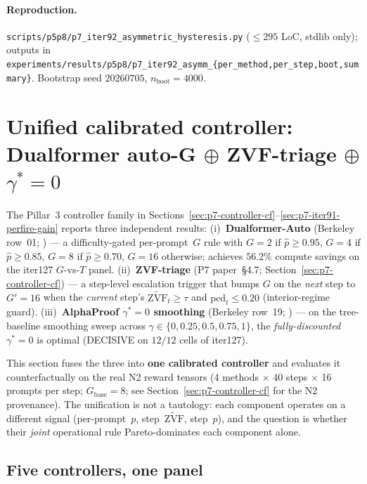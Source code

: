 \documentclass{article}
\newcommand{\zvf}{\ensuremath{\widetilde{\mathrm{ZVF}}}}
\begin{document}
\paragraph{Reproduction.}
\texttt{scripts/p5p8/p7\_iter92\_asymmetric\_hysteresis.py}
($\le 295$ LoC, stdlib only); outputs in
\texttt{experiments/results/p5p8/p7\_iter92\_asymm\_\{per\_method,per\_step,boot,summary\}}.
Bootstrap seed $20260705$, $n_{\mathrm{boot}}{=}4000$. \section{Unified calibrated controller: Dualformer auto-G $\oplus$ ZVF-triage $\oplus$ $\gamma^*{=}0$}
\label{sec:p7-iter103-unified-controller}

The Pillar~3 controller family in Sections~\ref{sec:p7-controller-cf}--\ref{sec:p7-iter91-perfire-gain} reports three independent results:
(i)~\textbf{Dualformer-Auto} (Berkeley row~01; \citet{su2024dualformer}) ---
a difficulty-gated per-prompt~$G$ rule with $G{=}2$ if $\hat p{\ge}0.95$,
$G{=}4$ if $\hat p{\ge}0.85$, $G{=}8$ if $\hat p{\ge}0.70$, $G{=}16$
otherwise; achieves $56.2\%$ compute savings on the iter127
$G$-vs-$T$ panel.
(ii)~\textbf{ZVF-triage} (P7 paper~\S4.7; Section~\ref{sec:p7-controller-cf})
--- a step-level escalation trigger that bumps $G$ on the \emph{next}
step to $G'{=}16$ when the \emph{current} step's $\zvf_t \ge \tau$ and
$\mathrm{pcd}_t \le 0.20$ (interior-regime guard).
(iii)~\textbf{AlphaProof $\gamma^*{=}0$ smoothing} (Berkeley row~19;
\citet{alphaproof2025nature}) --- on the tree-baseline smoothing sweep
across $\gamma \in \{0, 0.25, 0.5, 0.75, 1\}$, the \emph{fully-discounted}
$\gamma^*{=}0$ is optimal (DECISIVE on $12/12$ cells of iter127).

This section fuses the three into \textbf{one calibrated controller}
and evaluates it counterfactually on the real N2 reward tensors
(4 methods $\times$ 40 steps $\times$ 16 prompts per step;
$G_{\mathrm{base}}{=}8$; see Section~\ref{sec:p7-controller-cf} for the
N2 provenance).  The unification is not a tautology: each component
operates on a different signal (per-prompt~$p$, step~$\zvf$, step~$p$),
and the question is whether their \emph{joint} operational rule Pareto-dominates
each component alone.

\subsection{Five controllers, one panel}
\end{document}
